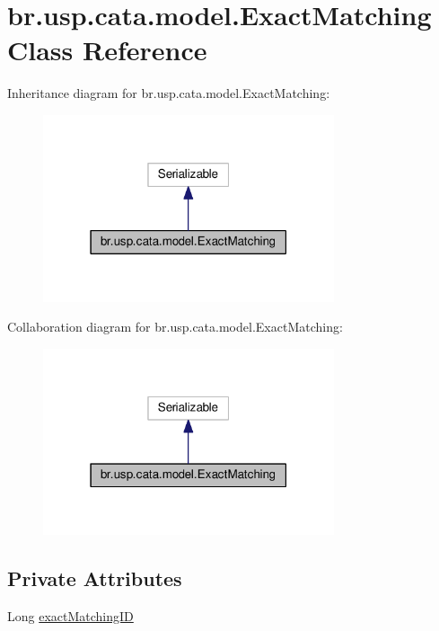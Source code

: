\hypertarget{classbr_1_1usp_1_1cata_1_1model_1_1_exact_matching}{\section{br.\+usp.\+cata.\+model.\+Exact\+Matching Class Reference}
\label{classbr_1_1usp_1_1cata_1_1model_1_1_exact_matching}
}


Inheritance diagram for br.\+usp.\+cata.\+model.\+Exact\+Matching\+:\nopagebreak
\begin{figure}[H]
\begin{center}
\leavevmode
\includegraphics[width=243pt]{classbr_1_1usp_1_1cata_1_1model_1_1_exact_matching__inherit__graph}
\end{center}
\end{figure}


Collaboration diagram for br.\+usp.\+cata.\+model.\+Exact\+Matching\+:\nopagebreak
\begin{figure}[H]
\begin{center}
\leavevmode
\includegraphics[width=243pt]{classbr_1_1usp_1_1cata_1_1model_1_1_exact_matching__coll__graph}
\end{center}
\end{figure}
\subsection*{Private Attributes}
\begin{DoxyCompactItemize}
\item 
Long \hyperlink{classbr_1_1usp_1_1cata_1_1model_1_1_exact_matching_a43fc6377284129a2373c4067b22ef966}{exact\+Matching\+I\+D}
\end{DoxyCompactItemize}
